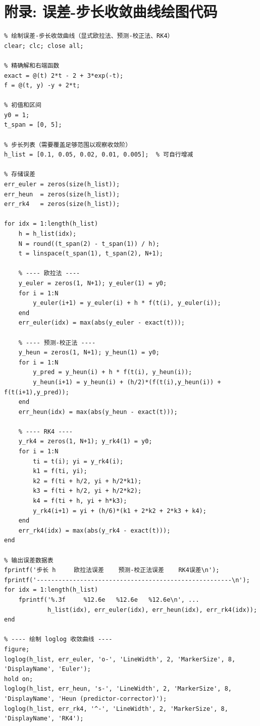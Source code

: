 \documentclass[12pt,a4paper]{ctexart}
\begin{document}
\section{附录: 误差-步长收敛曲线绘图代码}\label{code:error_step}
\begin{lstlisting}
% 绘制误差-步长收敛曲线（显式欧拉法、预测-校正法、RK4）
clear; clc; close all;

% 精确解和右端函数
exact = @(t) 2*t - 2 + 3*exp(-t);
f = @(t, y) -y + 2*t;

% 初值和区间
y0 = 1;
t_span = [0, 5];

% 步长列表（需要覆盖足够范围以观察收敛阶）
h_list = [0.1, 0.05, 0.02, 0.01, 0.005];  % 可自行增减

% 存储误差
err_euler = zeros(size(h_list));
err_heun  = zeros(size(h_list));
err_rk4   = zeros(size(h_list));

for idx = 1:length(h_list)
    h = h_list(idx);
    N = round((t_span(2) - t_span(1)) / h);
    t = linspace(t_span(1), t_span(2), N+1);
    
    % ---- 欧拉法 ----
    y_euler = zeros(1, N+1); y_euler(1) = y0;
    for i = 1:N
        y_euler(i+1) = y_euler(i) + h * f(t(i), y_euler(i));
    end
    err_euler(idx) = max(abs(y_euler - exact(t)));
    
    % ---- 预测-校正法 ----
    y_heun = zeros(1, N+1); y_heun(1) = y0;
    for i = 1:N
        y_pred = y_heun(i) + h * f(t(i), y_heun(i));
        y_heun(i+1) = y_heun(i) + (h/2)*(f(t(i),y_heun(i)) + f(t(i+1),y_pred));
    end
    err_heun(idx) = max(abs(y_heun - exact(t)));
    
    % ---- RK4 ----
    y_rk4 = zeros(1, N+1); y_rk4(1) = y0;
    for i = 1:N
        ti = t(i); yi = y_rk4(i);
        k1 = f(ti, yi);
        k2 = f(ti + h/2, yi + h/2*k1);
        k3 = f(ti + h/2, yi + h/2*k2);
        k4 = f(ti + h, yi + h*k3);
        y_rk4(i+1) = yi + (h/6)*(k1 + 2*k2 + 2*k3 + k4);
    end
    err_rk4(idx) = max(abs(y_rk4 - exact(t)));
end

% 输出误差数据表
fprintf('步长 h     欧拉法误差    预测-校正法误差    RK4误差\n');
fprintf('------------------------------------------------------\n');
for idx = 1:length(h_list)
    fprintf('%.3f     %12.6e   %12.6e   %12.6e\n', ...
            h_list(idx), err_euler(idx), err_heun(idx), err_rk4(idx));
end

% ---- 绘制 loglog 收敛曲线 ----
figure;
loglog(h_list, err_euler, 'o-', 'LineWidth', 2, 'MarkerSize', 8, 'DisplayName', 'Euler');
hold on;
loglog(h_list, err_heun, 's-', 'LineWidth', 2, 'MarkerSize', 8, 'DisplayName', 'Heun (predictor-corrector)');
loglog(h_list, err_rk4, '^-', 'LineWidth', 2, 'MarkerSize', 8, 'DisplayName', 'RK4');


\end{lstlisting}
\end{document}
